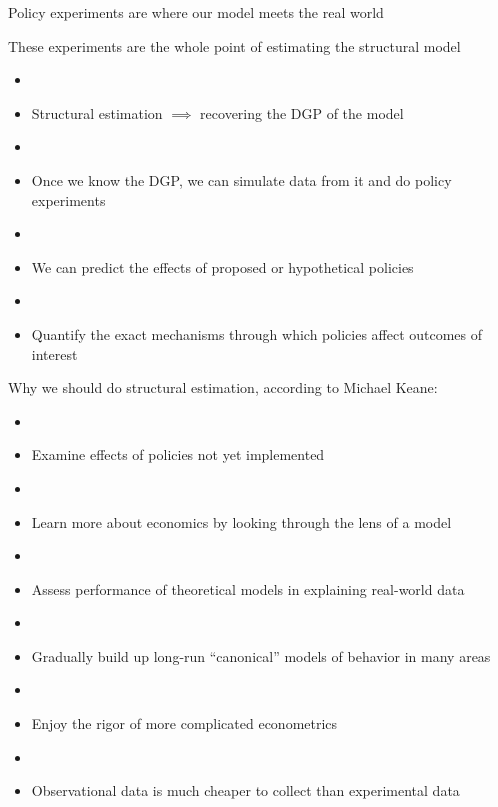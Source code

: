 \documentclass[aspectratio=169]{beamer}
\begin{document}
\begin{frame}

Policy experiments are where our model meets the real world

\bigskip{}
\bigskip{}


These experiments are the whole point of estimating the structural model
\begin{itemize}
\item[]
\item Structural estimation $\implies$ recovering the DGP of the model
\item[]
\item Once we know the DGP, we can simulate data from it and do policy experiments
\item[]
\item We can predict the effects of proposed or hypothetical policies
\item[]
\item Quantify the exact mechanisms through which policies affect outcomes of interest
\end{itemize}


\end{frame}



\begin{frame}
Why we should do structural estimation, according to Michael Keane:

\begin{itemize}
\item[]
\item Examine effects of policies not yet implemented
\item[]
\item Learn more about economics by looking through the lens of a model
\item[]
\item Assess performance of theoretical models in explaining real-world data
\item[]
\item Gradually build up long-run ``canonical'' models of behavior in many areas
\item[]
\item Enjoy the rigor of more complicated econometrics
\item[]
\item Observational data is much cheaper to collect than experimental data
\end{itemize}
\end{frame}
\end{document}
